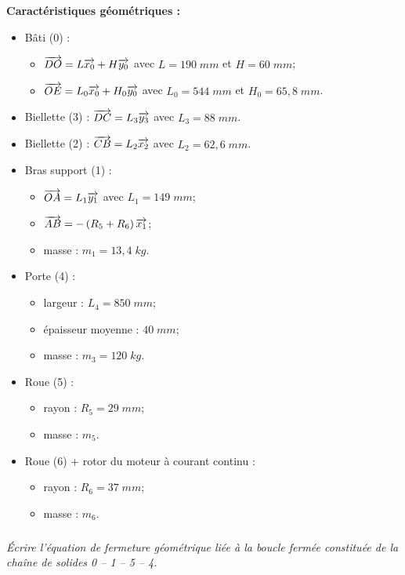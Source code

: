 \documentclass[10pt]{article}
\begin{document}
{\begin{hypo}
\textbf{Caractéristiques géométriques :}
\begin{itemize}
\item Bâti (0) :
\begin{itemize}
\item $\overrightarrow{DO}=L\overrightarrow{x_0} + H\overrightarrow{y_0}$ avec $L=190\; mm$ et $H=60\; mm$;
\item $\overrightarrow{OE}=L_0\overrightarrow{x_0} + H_0\overrightarrow{y_0}$ avec $L_0=544\; mm$ et $H_0=65,8\; mm$.
\end{itemize}
\item Biellette (3) : $\overrightarrow{DC}=L_3\overrightarrow{y_3}$ avec $L_3 = 88\; mm$.
\item Biellette (2) : $\overrightarrow{CB}=L_2\overrightarrow{x_2}$ avec $L_2 = 62,6\; mm$.
\item Bras support (1) : 
\begin{itemize}
\item $\overrightarrow{OA}=L_1\overrightarrow{y_1}$ avec $L_1 = 149\; mm$;
\item $\overrightarrow{AB}=-\left( R_5+R_6\right)\overrightarrow{x_1}$;
\item masse : $m_1 = 13,4\; kg$.
\end{itemize}
\item Porte (4) : 
\begin{itemize}
\item largeur : $L_4 = 850 \; mm$;
\item épaisseur moyenne : $40\; mm$;
\item masse : $m_3 = 120\; kg$.
\end{itemize}
\item Roue (5) : 
\begin{itemize}
\item rayon : $R_5 = 29\; mm$;
\item masse : $m_5$.
\end{itemize}
\item Roue (6) + rotor du moteur à courant continu : 
\begin{itemize}
\item rayon : $R_6 = 37\; mm$;
\item masse : $m_6$.
\end{itemize}
\end{itemize}
\end{hypo}

}

\subparagraph{\label{ferm_geo}}
\textit{Écrire l'équation de fermeture géométrique liée à la boucle fermée constituée de la chaîne de solides 0 -- 1 -- 5 -- 4.}
\end{document}
